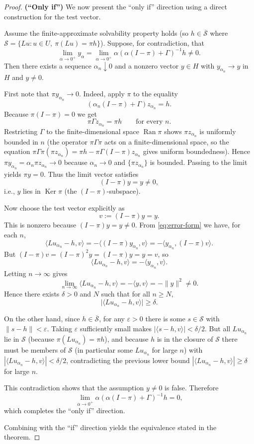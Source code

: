 \documentclass[10pt,a4paper]{amsart}
\DeclareMathOperator{\Ker}{Ker}
\DeclareMathOperator{\Ran}{Ran}
\begin{document}
\begin{proof}
		\medskip\noindent
		\textbf{(``Only if'')} We now present the ``only if'' direction using a direct construction for the test vector.
		
		Assume the finite-approximate solvability property holds (so \(h \in \overline{\mathcal S}\) where \(\mathcal S = \{Lu: u \in U,\ \pi(Lu)=\pi h\}\)). Suppose, for contradiction, that
		\[
		\lim_{\alpha\to0^+} y_\alpha = \lim_{\alpha\to0^+} \alpha(\alpha(I-\pi)+\Gamma)^{-1}h \neq 0.
		\]
		Then there exists a sequence \(\alpha_n \downarrow 0\) and a nonzero vector \(y \in H\) with \(y_{\alpha_n} \to y\) in \(H\) and \(y \ne 0\).
		
		First note that \(\pi y_{\alpha_n} \to 0\). Indeed, apply \(\pi\) to the equality
		\[
		(\alpha_n(I-\pi)+\Gamma) z_{\alpha_n} = h.
		\]
		Because \(\pi(I-\pi)=0\) we get
		\[
		\pi\Gamma z_{\alpha_n} = \pi h \qquad\text{for every }n.
		\]
		Restricting \(\Gamma\) to the finite-dimensional space \(\Ran \pi\) shows \(\pi z_{\alpha_n}\) is uniformly bounded in \(n\) (the operator \(\pi\Gamma\pi\) acts on a finite-dimensional space, so the equation \(\pi\Gamma\pi(\pi z_{\alpha_n}) = \pi h - \pi\Gamma(I-\pi)z_{\alpha_n}\) gives uniform boundedness). Hence \(\pi y_{\alpha_n} = \alpha_n \pi z_{\alpha_n} \to 0\) because \(\alpha_n \to 0\) and \(\{\pi z_{\alpha_n}\}\) is bounded. Passing to the limit yields \(\pi y = 0\). Thus the limit vector satisfies
		\[
		(I-\pi)y = y \neq 0,
		\]
		i.e., \(y\) lies in \(\Ker \pi\) (the \((I-\pi)\)-subspace).
		
		Now choose the test vector explicitly as
		\[
		v := (I-\pi)y = y.
		\]
		This is nonzero because \((I-\pi)y = y \neq 0\). From \eqref{eq:error-form} we have, for each \(n\),
		\[
		\langle Lu_{\alpha_n}-h, v\rangle = -\langle (I-\pi)y_{\alpha_n}, v\rangle = -\langle y_{\alpha_n}, (I-\pi)v\rangle.
		\]
		But \((I-\pi)v = (I-\pi)^2 y = (I-\pi)y = y = v\), so
		\[
		\langle Lu_{\alpha_n}-h, v\rangle = -\langle y_{\alpha_n}, v\rangle.
		\]
		Letting \(n \to \infty\) gives
		\[
		\lim_{n\to\infty}\langle Lu_{\alpha_n}-h, v\rangle = -\langle y, v\rangle = -\|y\|^2 \neq 0.
		\]
		Hence there exists \(\delta > 0\) and \(N\) such that for all \(n \ge N\),
		\[
		\big|\langle Lu_{\alpha_n}-h, v\rangle\big| \ge \delta.
		\]
		
		On the other hand, since \(h \in \overline{\mathcal S}\), for any \(\varepsilon > 0\) there is some \(s \in \mathcal S\) with \(\|s-h\| < \varepsilon\). Taking \(\varepsilon\) sufficiently small makes \(|\langle s-h, v\rangle| < \delta/2\). But all \(Lu_{\alpha_n}\) lie in \(\mathcal S\) (because \(\pi(Lu_{\alpha_n}) = \pi h\)), and because \(h\) is in the closure of \(\mathcal S\) there must be members of \(\mathcal S\) (in particular some \(Lu_{\alpha_n}\) for large \(n\)) with \(|\langle Lu_{\alpha_n}-h, v\rangle| < \delta/2\), contradicting the previous lower bound \(|\langle Lu_{\alpha_n}-h, v\rangle| \ge \delta\) for large \(n\).
		
		This contradiction shows that the assumption \(y \ne 0\) is false. Therefore
		\[
		\lim_{\alpha\to0^+}\alpha(\alpha(I-\pi)+\Gamma)^{-1}h = 0,
		\]
		which completes the ``only if'' direction.
		
		Combining with the ``if'' direction yields the equivalence stated in the theorem.
	\end{proof}
\end{document}
